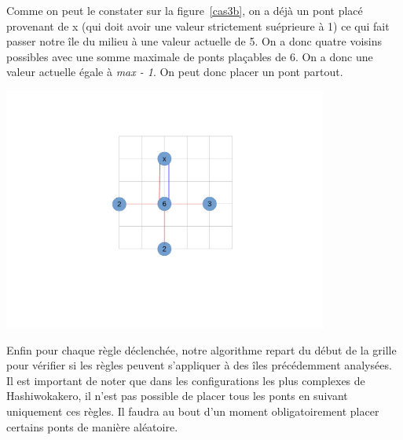 \documentclass[french]{article}
\begin{document}
\begin{itemize}
\begin{enumerate}
            \label{cas3b}
            \vspace{0.5cm}
            Comme on peut le constater sur la figure~\ref{cas3b}, on a déjà un pont placé provenant de x (qui doit avoir une valeur strictement suéprieure à 1) ce qui fait passer notre île du milieu à une valeur actuelle de 5. On a donc quatre voisins possibles avec une somme maximale de ponts plaçables de 6. On a donc une valeur actuelle égale à  \textit{max - 1}. On peut donc placer un pont partout.
            \centerline{\includegraphics[width=0.8\textwidth]{Cas3bResolu.pdf}}
            \label{cas3bRes} 
            \vspace{0.5cm}
        \end{enumerate}
    \end{itemize}
Enfin pour chaque règle déclenchée, notre algorithme repart du début de la grille pour vérifier si les règles peuvent s'appliquer à des îles précédemment analysées. \\
\newline
Il est important de noter que dans les configurations les plus complexes de Hashiwokakero, il n'est pas possible de placer tous les ponts en suivant uniquement ces règles. Il faudra au bout d'un moment obligatoirement placer certains ponts de manière aléatoire. 
\end{document}
